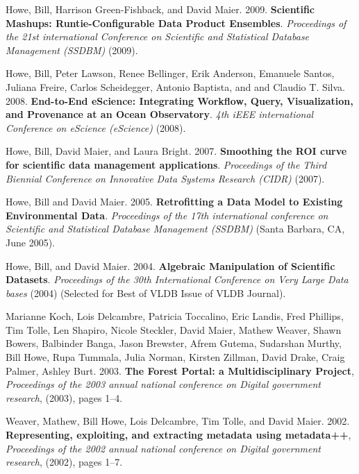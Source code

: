 \begin{bulletlist}
\item Howe, Bill, Harrison Green-Fishback, and David Maier. 2009. \textbf{Scientific Mashups:
Runtie-Configurable Data Product Ensembles}. \emph{Proceedings of the
21st international Conference on Scientific and Statistical Database
Management (SSDBM)} (2009). 

\item Howe, Bill, Peter Lawson, Renee
Bellinger, Erik Anderson, Emanuele Santos, Juliana Freire, Carlos
Scheidegger, Antonio Baptista, and and Claudio T. Silva. 2008.
\textbf{End-to-End eScience: Integrating Workflow, Query, Visualization, and
Provenance at an Ocean Observatory}. \emph{4th iEEE international
Conference on eScience (eScience)} (2008).

\item Howe, Bill, David Maier, and Laura Bright. 2007. \textbf{Smoothing the ROI
curve for scientific data management applications}. \emph{Proceedings of
the Third Biennial Conference on Innovative Data Systems Research (CIDR)} 
(2007). 

\item Howe, Bill and David Maier. 2005. \textbf{Retrofitting a Data Model to Existing
Environmental Data}. \emph{Proceedings of the 17th international
conference on Scientific and Statistical Database Management (SSDBM)} 
(Santa Barbara, CA, June 2005). 

\item Howe, Bill, and David Maier. 2004.
\textbf{Algebraic Manipulation of Scientific Datasets}. 
\emph{Proceedings of the 30th International Conference on Very Large Data
bases} (2004) (Selected for Best of VLDB Issue of VLDB Journal). 

\item Marianne Koch, Lois Delcambre,
Patricia Toccalino, Eric Landis, Fred Phillips, Tim Tolle,
Len Shapiro, Nicole Steckler, David Maier, Mathew Weaver,
Shawn Bowers, Balbinder Banga,
Jason Brewster, Afrem Gutema, Sudarshan Murthy, Bill Howe, Rupa Tummala,
Julia Norman, Kirsten Zillman,
David Drake, Craig Palmer,
Ashley Burt. 2003. \textbf{The Forest Portal: a Multidisciplinary Project}, 
  \emph{Proceedings of the 2003 annual national conference on Digital government research},
(2003), pages 1--4.

\item Weaver, Mathew, Bill Howe, Lois Delcambre, Tim Tolle, and David Maier. 2002. 
\textbf{Representing, exploiting, and extracting metadata using metadata++},
\emph{Proceedings of the 2002 annual national conference on Digital government research},
(2002), pages 1--7.

\end{bulletlist}



